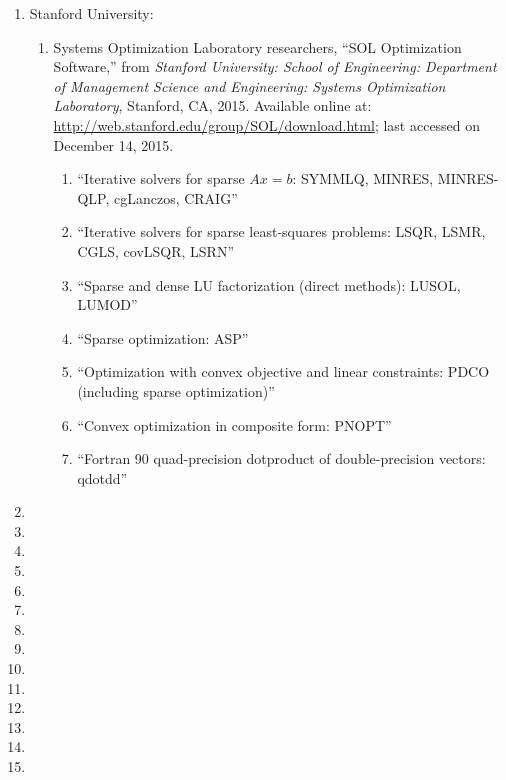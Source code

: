 \begin{enumerate}
\item Stanford University: \vspace{-0.3cm}
	\begin{enumerate} \itemsep -2pt
	\item Systems Optimization Laboratory researchers, ``SOL Optimization Software,'' from {\it Stanford University: School of Engineering: Department of Management Science and Engineering: Systems Optimization Laboratory}, Stanford, CA, 2015. Available online at: \url{http://web.stanford.edu/group/SOL/download.html}; last accessed on December 14, 2015. \vspace{-0.2cm}
		\begin{enumerate} \itemsep -2pt
		\item ``Iterative solvers for sparse $Ax = b$: SYMMLQ, MINRES, MINRES-QLP, cgLanczos, CRAIG''
		\item ``Iterative solvers for sparse least-squares problems: LSQR, LSMR, CGLS, covLSQR, LSRN''
		\item ``Sparse and dense LU factorization (direct methods): LUSOL, LUMOD''
		\item ``Sparse optimization: ASP''
		\item ``Optimization with convex objective and linear constraints: PDCO (including sparse optimization)''
		\item ``Convex optimization in composite form: PNOPT''
		\item ``Fortran 90 quad-precision dotproduct of double-precision vectors: qdotdd''
		\end{enumerate}
	\end{enumerate}
\item 
\item 
\item 
\item 
\item 
\item 
\item 
\item 
\item 
\item 
\item 
\item 
\item 
\item 
\end{enumerate}
